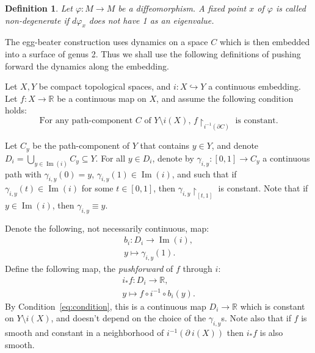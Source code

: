 \documentclass[11pt]{article}
\newenvironment{myequation}
    {
        \begin{equation*}
        \begin{gathered}
    }
    { 
        \end{gathered} 
        \end{equation*}
    }
\newtheorem{definition}[theorem]{Definition}
\newcommand{\R}{\mathbb{R}}
\DeclareMathOperator{\Ima}{Im}
\begin{document}
        \begin{definition}
            Let $\varphi: M \to M$ be a diffeomorphism. A fixed point $x$ of $\varphi$ is called non-degenerate if $d\varphi_x$ does not have 1 as an eigenvalue.
        \end{definition}
        
        The egg-beater construction uses dynamics on a space $C$ which is then embedded into a surface of genus 2. Thus we shall use the following definitions of pushing forward the dynamics along the embedding.
        
        Let $X,Y$ be compact topological spaces, and $i: X \hookrightarrow Y$ a continuous embedding. Let $f: X \to \R$ be a continuous map on $X$, and assume the following condition holds:
        \begin{equation}
        \label{eq:condition}
            \text{For any path-component $C$ of $Y \setminus i(X)$, $f \restriction_{i^{-1}(\partial C)}$ is constant.}
        \end{equation}
            
        Let $C_y$ be the path-component of $Y$ that contains $y \in Y$, and denote $D_i = \bigcup_{y \in \Ima(i)} C_y \subseteq Y$. For all $y \in D_i$, denote by $\gamma_{i,y}: [0,1] \to C_y$ a continuous path with $\gamma_{i,y}(0) = y$, $\gamma_{i,y}(1) \in \Ima(i)$, and such that if $\gamma_{i,y}(t) \in \Ima(i)$ for some $t \in [0,1]$, then $\gamma_{i,y} \restriction_{[t,1]}$ is constant. Note that if $y \in \Ima(i)$, then $\gamma_{i,y} \equiv y$.
        
        Denote the following, not necessarily continuous, map:
        \begin{myequation}
            b_i: D_i \to \Ima(i) ,\\
            y \mapsto \gamma_{i,y}(1) .
        \end{myequation}
        Define the following map, the \textit{pushforward} of $f$ through $i$:
        \begin{myequation}
            i_* f: D_i \to \R ,\\
            y \mapsto f \circ i^{-1} \circ b_i(y) .
        \end{myequation}
        By Condition~\ref{eq:condition}, this is a continuous map $D_i \to \R$ which is constant on $Y \setminus i(X)$, and doesn't depend on the choice of the $\gamma_{i,y}$s. Note also that if $f$ is smooth and constant in a neighborhood of $i^{-1}(\partial \ i(X))$ then $i_* f$ is also smooth. 
        
\end{document}
